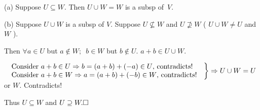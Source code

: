 \documentclass[a4paper, 11pt, UTF8]{article}
\def\Hb{{\large\Blind{(b) }}}
\begin{document}
\begin{large}
\par\quad
(a) Suppose $U\subseteq W$. Then $U\cup W=W$ is a subsp of \,$V$.\par\quad
(b) Suppose $U\cup W$ is a subsp of $V$. Suppose $U\not\subseteq W$ and $U\not\supseteq W$ ( $U\cup W\neq U$ and $W$ ).\par\quad\Hb
Then $\forall a\in U$ but $a\not\in W;\,\,\,b\in W$ but $b\not\in U.\,\,a+b\in U\cup W$.\par\vspace{6pt}\qquad
$\MathRightBrace{l}{$
Consider $a+b\in U\Rightarrow b=(a+b)+(-a)\in U$, contradicts!$\\ $
Consider $a+b\in W\Rightarrow a=(a+b)+(-b)\in W$, contradicts!
$}\Rightarrow U\cup W=U$ or $W.$ Contradicts!\par\vspace{6pt}\quad\Hb
Thus $U\subseteq W$ and $U\supseteq W.\hfill\square$\par
\SepLine\par


\end{large}
\end{document}
